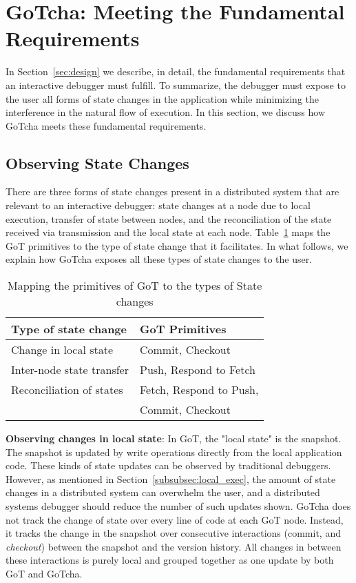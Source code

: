 \section{GoTcha: Meeting the Fundamental Requirements}
\label{sec:meeting_req}

In Section~\ref{sec:design} we describe, in detail, the fundamental requirements that an interactive debugger must fulfill. To summarize, the debugger must expose to the user all forms of state changes in the application while minimizing the interference in the natural flow of execution. In this section, we discuss how GoTcha meets these fundamental requirements.  

\subsection{Observing State Changes}
There are three forms of state changes present in a distributed system that are relevant to an interactive debugger: state changes at a node due to local execution, transfer of state between nodes, and the reconciliation of the state received via transmission and the local state at each node. Table~\ref{tab:primitive_function} maps the GoT primitives to the type of state change that it facilitates. In what follows, we explain how GoTcha exposes all these types of state changes to the user.

\begin{table}
    \centering
    \begin{tabular}{l|l}
        {\bf Type of state change} & {\bf GoT Primitives} \\
        \hline
        Change in local state & Commit, Checkout \\
        \hline
        Inter-node state transfer & Push, Respond to Fetch \\
        \hline
        Reconciliation of states & Fetch, Respond to Push,\\ & Commit, Checkout \\
    \end{tabular}
    \caption{Mapping the primitives of GoT to the types of State changes}
    \label{tab:primitive_function}
\end{table}

{\bf Observing changes in local state}: In GoT, the "local state" is the snapshot. The snapshot is updated by write operations directly from the local application code. These kinds of state updates can be observed by traditional debuggers. However, as mentioned in Section~\ref{subsubsec:local_exec}, the amount of state changes in a distributed system can overwhelm the user, and a distributed systems debugger should reduce the number of such updates shown. GoTcha does not track the change of state over every line of code at each GoT node. Instead, it tracks the change in the snapshot over consecutive interactions (commit, and {\em checkout}) between the snapshot and the version history. All changes in between these interactions is purely local and grouped together as one update by both GoT and GoTcha.

